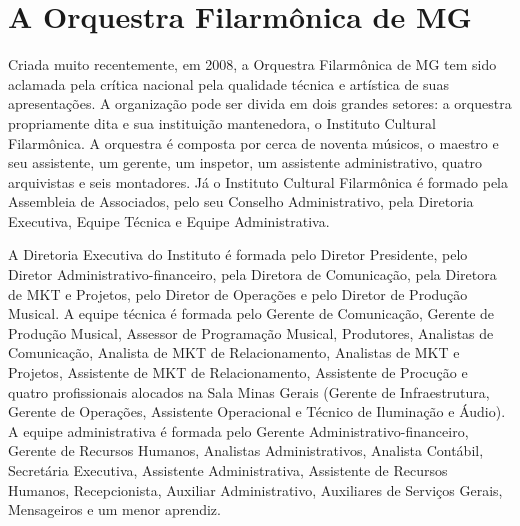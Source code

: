 \documentclass[a4paper, 12pt, openright, oneside, german, french, english, brazil]{abntex2}
\begin{document}
	\section{A Orquestra Filarmônica de MG}



	Criada muito recentemente, em 2008, a Orquestra Filarmônica de MG tem sido aclamada pela crítica nacional pela qualidade técnica e artística de suas apresentações. A organização pode ser divida em dois grandes setores: a orquestra propriamente dita e sua instituição mantenedora, o Instituto Cultural Filarmônica. A orquestra é composta por cerca de noventa músicos, o maestro e seu assistente, um gerente, um inspetor, um assistente administrativo, quatro arquivistas e seis montadores. Já o Instituto Cultural Filarmônica é formado pela Assembleia de Associados, pelo seu Conselho Administrativo, pela Diretoria Executiva, Equipe Técnica e Equipe Administrativa.



	A Diretoria Executiva do Instituto é formada pelo Diretor Presidente, pelo Diretor Administrativo-financeiro, pela Diretora de Comunicação, pela Diretora de MKT e Projetos, pelo Diretor de Operações e pelo Diretor de Produção Musical. A equipe técnica é formada pelo Gerente de Comunicação, Gerente de Produção Musical, Assessor de Programação Musical, Produtores, Analistas de Comunicação, Analista de MKT de Relacionamento, Analistas de MKT e Projetos, Assistente de MKT de Relacionamento, Assistente de Procução e quatro profissionais alocados na Sala Minas Gerais (Gerente de Infraestrutura, Gerente de Operações, Assistente Operacional e Técnico de Iluminação e Áudio). A equipe administrativa é formada pelo Gerente Administrativo-financeiro, Gerente de Recursos Humanos, Analistas Administrativos, Analista Contábil, Secretária Executiva, Assistente Administrativa, Assistente de Recursos Humanos, Recepcionista, Auxiliar Administrativo, Auxiliares de Serviços Gerais, Mensageiros e um menor aprendiz.
\end{document}
